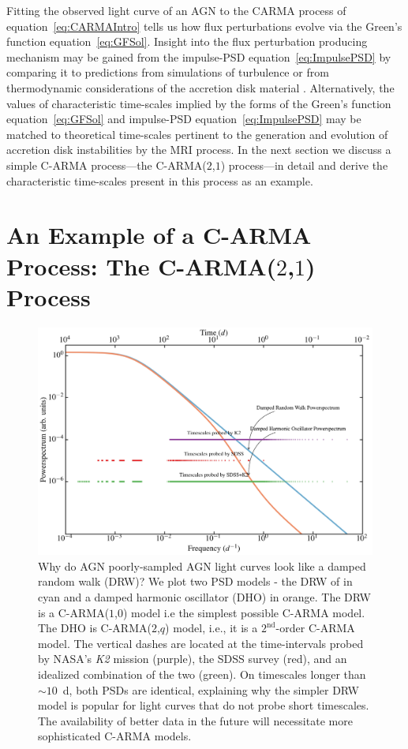 \documentclass[a4paper,fleqn,usenatbib]{mnras}
\begin{document}
Fitting the observed light curve of an AGN to the CARMA process of equation~\eqref{eq:CARMAIntro} tells us how flux perturbations evolve via the Green's function equation~\eqref{eq:GFSol}. Insight into the flux perturbation producing mechanism may be gained from the impulse-PSD equation~\eqref{eq:ImpulsePSD} by comparing it to predictions from simulations of turbulence \citep{EddySim15} or from thermodynamic considerations of the accretion disk material \citep{Mellen52}. Alternatively, the values of characteristic time-scales implied by the forms of the Green's function equation~\eqref{eq:GFSol} and impulse-PSD equation~\eqref{eq:ImpulsePSD} may be matched to theoretical time-scales pertinent to the generation and evolution of accretion disk instabilities by the MRI process. In the next section we discuss a simple C-ARMA process---the C-ARMA($2$,$1$) process---in detail and derive the characteristic time-scales present in this process as an example.

\section[C-ARMA($2$,$1$)]{An Example of a C-ARMA Process: The C-ARMA($2$,$1$) Process}\label{sec:CARMA21}

\begin{figure}
    \includegraphics[width=\textwidth]{Figure1.jpg}
    \caption{Why do AGN poorly-sampled AGN light curves look like a damped random walk (DRW)? We plot two PSD models - the DRW of \citet{Kelly09} in cyan and a damped harmonic oscillator (DHO) in orange. The DRW is a C-ARMA($1$,$0$) model i.e  the simplest possible C-ARMA model. The DHO is C-ARMA($2$,$q$) model, i.e., it is a $2^{\text{nd}}$-order C-ARMA model. The vertical dashes are located at the time-intervals probed by NASA's \textit{K2} mission (purple), the SDSS survey (red), and an idealized combination of the two (green). On timescales longer than $\sim 10$~d, both PSDs are identical, explaining why the simpler DRW model is popular for light curves that do not probe short timescales. The availability of better data in the future will necessitate more sophisticated C-ARMA models.}
    \label{fig:PowerOfSDSSK2}
\end{figure}
\end{document}

